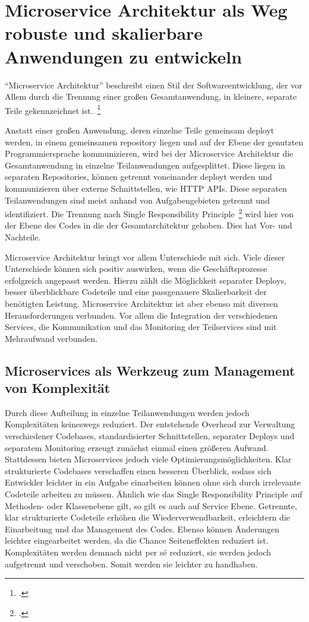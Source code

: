 \chapter{Microservice Architektur als Weg robuste und skalierbare Anwendungen zu entwickeln}
``Microservice Architektur'' beschreibt einen Stil der Softwareentwicklung, der vor Allem durch die Trennung einer großen Gesamtanwendung, in kleinere, separate Teile gekennzeichnet ist.~\footcite[vgl.][Seite 2]{newman2015building}

Anstatt einer großen Anwendung, deren einzelne Teile gemeinsam deployt werden, in einem gemeinsamen repository liegen und auf der Ebene der genutzten Programmiersprache kommunizieren, wird bei der Microservice Architektur die Gesamtanwendung in einzelne Teilanwendungen aufgesplittet. Diese liegen in separaten Repositories, können getrennt voneinander deployt werden und kommunizieren über externe Schnittstellen, wie HTTP APIs. Diese separaten Teilanwendungen sind meist anhand von Aufgabengebieten getrennt und identifiziert. Die Trennung nach Single Responsibility Principle~\footcite{wiki:srp} wird hier von der Ebene des Codes in die der Gesamtarchitektur gehoben. Dies hat Vor- und Nachteile.

Microservice Architektur bringt vor allem Unterschiede mit sich. Viele dieser Unterschiede können sich positiv auswirken, wenn die Geschäftsprozesse erfolgreich angepasst werden. Hierzu zählt die Möglichkeit separater Deploys, besser überblickbare Codeteile und eine passgenauere Skalierbarkeit der benötigten Leistung. Microservice Architektur ist aber ebenso mit diversen Herausforderungen verbunden. Vor allem die Integration der verschiedenen Services, die Kommunikation und das Monitoring der Teilservices sind mit Mehraufwand verbunden.

\section{Microservices als Werkzeug zum Management von Komplexität}
Durch diese Aufteilung in einzelne Teilanwendungen werden jedoch Komplexitäten keineswegs reduziert. Der entstehende Overhead zur Verwaltung verschiedener Codebases, standardisierter Schnittstellen, separater Deploys und separatem Monitoring erzeugt zunächst einmal einen größeren Aufwand. Stattdessen bieten Microservices jedoch viele Optimierungsmöglichkeiten. Klar strukturierte Codebases verschaffen einen besseren Überblick, sodass sich Entwickler leichter in ein Aufgabe einarbeiten können ohne sich durch irrelevante Codeteile arbeiten zu müssen. Ähnlich wie das Single Responsibility Principle auf Methoden- oder Klassenebene gilt, so gilt es auch auf Service Ebene. Getrennte, klar strukturierte Codeteile erhöhen die Wiederverwendbarkeit, erleichtern die Einarbeitung und das Management des Codes. Ebenso können Änderungen leichter eingearbeitet werden, da die Chance Seiteneffekten reduziert ist. Komplexitäten werden demnach nicht per sé reduziert, sie werden jedoch aufgetrennt und verschoben. Somit werden sie leichter zu handhaben.

